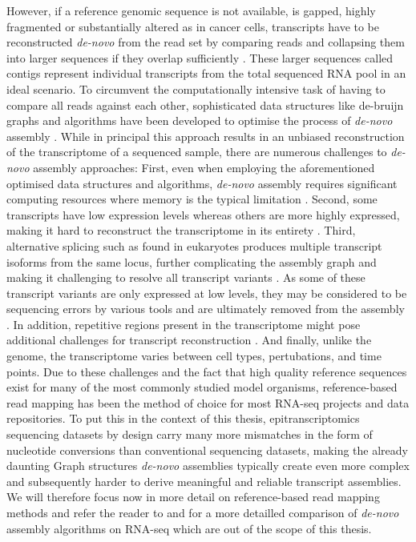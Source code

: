 However, if a reference genomic sequence is not available, is gapped, highly fragmented or substantially altered as in cancer cells, transcripts have to be reconstructed \textit{de-novo} from the read set by comparing reads and collapsing them into larger sequences if they overlap sufficiently \citep{Grabherr2011}. These larger sequences called contigs represent individual transcripts from the total sequenced RNA pool in an ideal scenario. To circumvent the computationally intensive task of having to compare all reads against each other, sophisticated data structures like de-bruijn graphs \citep{Pevzner2001} and algorithms have been developed to optimise the process of \textit{de-novo} assembly \citep{Schatz2010}. While in principal this approach results in an unbiased reconstruction of the transcriptome of a sequenced sample, there are numerous challenges to \textit{de-novo} assembly approaches: First, even when employing the aforementioned optimised data structures and algorithms, \textit{de-novo} assembly requires significant computing resources where memory is the typical limitation \citep{Martin2011}. Second, some transcripts have low expression levels whereas others are more highly expressed, making it hard to reconstruct the transcriptome in its entirety \citep{Martin2011}. Third, alternative splicing such as found in eukaryotes produces multiple transcript isoforms from the same locus, further complicating the assembly graph and making it challenging to resolve all transcript variants \citep{Conesa2016}. As some of these transcript variants are only expressed at low levels, they may be considered to be sequencing errors by various tools and are ultimately removed from the assembly \citep{Haas2010}. In addition, repetitive regions present in the transcriptome might pose additional challenges for transcript reconstruction \citep{Lima2017}. And finally, unlike the genome, the transcriptome varies between cell types, pertubations, and time points. Due to these challenges and the fact that high quality reference sequences exist for many of the most commonly studied model organisms, reference-based read mapping has been the method of choice for most RNA-seq projects and data repositories. To put this in the context of this thesis, epitranscriptomics sequencing datasets by design carry many more mismatches in the form of nucleotide conversions than conventional sequencing datasets, making the already daunting Graph structures \textit{de-novo} assemblies typically create even more complex and subsequently harder to derive meaningful and reliable transcript assemblies. We will therefore focus now in more detail on reference-based read mapping methods and refer the reader to \cite{Martin2011} and \cite{Hoelzer2019} for a more detailled comparison of \textit{de-novo} assembly algorithms on RNA-seq which are out of the scope of this thesis.
